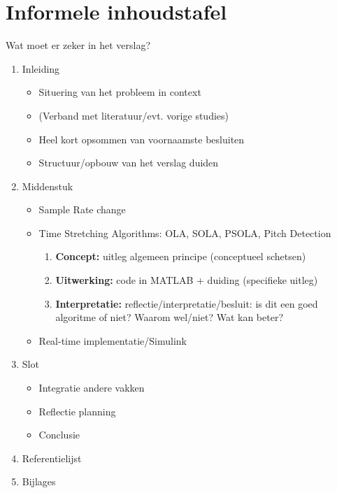 \documentclass[12pt]{report}
\begin{document}
\section{Informele inhoudstafel}
Wat moet er zeker in het verslag?
\begin{enumerate}
\item Inleiding
\begin{itemize}
\item Situering van het probleem in context
\item (Verband met literatuur/evt. vorige studies)
\item Heel kort opsommen van voornaamste besluiten
\item Structuur/opbouw van het verslag duiden
\end{itemize}
\item Middenstuk
\begin{itemize}
\item Sample Rate change
\item Time Stretching Algorithms: OLA, SOLA, PSOLA, Pitch Detection
\begin{enumerate}
\item \textbf{Concept:} uitleg algemeen principe (conceptueel schetsen)
\item \textbf{Uitwerking:} code in MATLAB + duiding (specifieke uitleg)
\item \textbf{Interpretatie:} reflectie/interpretatie/besluit: is dit een goed algoritme of niet? Waarom wel/niet? Wat kan beter?
\end{enumerate}
\item Real-time implementatie/Simulink
\end{itemize}
\item Slot
\begin{itemize}
\item Integratie andere vakken
\item Reflectie planning
\item Conclusie
\end{itemize}
\item Referentielijst
\item Bijlages
\end{enumerate}
\end{document}
